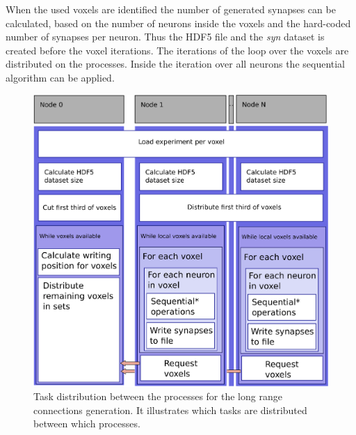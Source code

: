 When the used voxels are identified the number of generated synapses can be calculated, based on the
number of neurons inside the voxels and the hard-coded number of synapses per neuron.
Thus the HDF5 file and the \emph{syn} dataset is created before the voxel iterations.
The iterations of the loop over the voxels are distributed on the processes.
Inside the iteration over all neurons the sequential algorithm can be applied.
\begin{figure}[ht!]
\centering
\includegraphics[scale=0.5]{pictures/longRange_parallelAlg.eps}
\caption{Task distribution between the processes for the long range connections generation. It illustrates which tasks are distributed between which processes.}
\label{fig:longrangParallel}
\end{figure}

